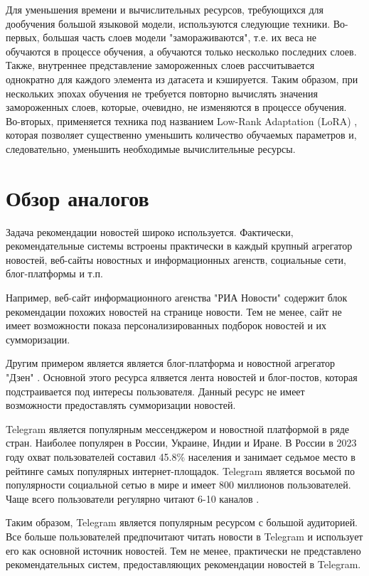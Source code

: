 Для уменьшения времени и вычислительных ресурсов, требующихся для дообучения большой языковой модели, используются следующие техники. Во-первых, большая часть слоев модели "замораживаются", т.е. их веса не обучаются в процессе обучения, а обучаются только несколько последних слоев. Также, внутреннее представление замороженных слоев рассчитывается однократно для каждого элемента из датасета и кэшируется. Таким образом, при нескольких эпохах обучения не требуется повторно вычислять значения замороженных слоев, которые, очевидно, не изменяются в процессе обучения. Во-вторых, применяется техника под названием Low-Rank Adaptation (LoRA) \cite{lora}, которая позволяет существенно уменьшить количество обучаемых параметров и, следовательно, уменьшить необходимые вычислительные ресурсы.

\section{Обзор аналогов}

Задача рекомендации новостей широко используется. Фактически, рекомендательные системы встроены практически в каждый крупный агрегатор новостей, веб-сайты новостных и информационных агенств, социальные сети, блог-платформы и т.п.

Например, веб-сайт информационного агенства "РИА Новости" \cite{ria_news} содержит блок рекомендации похожих новостей на странице новости. Тем не менее, сайт не имеет возможности показа персонализированных подборок новостей и их сумморизации.

Другим примером является является блог-платформа и новостной агрегатор "Дзен" \cite{dzen}. Основной этого ресурса ялвяется лента новостей и блог-постов, которая подстраивается под интересы пользователя. Данный ресурс не имеет возможности предоставлять сумморизации новостей.

Telegram \cite{telegram} является популярным мессенджером и новостной платформой в ряде стран. Наиболее популярен в России, Украине, Индии и Иране. В России в 2023 году охват пользователей составил 45.8\% населения и занимает седьмое место в рейтинге самых популярных интернет-площадок. Telegram является восьмой по популярности социальной сетью в мире и имеет 800 миллионов пользователей. Чаще всего пользователи регулярно читают 6-10 каналов \cite{telegram_stat}.

Таким образом, Telegram является популярным ресурсом с большой аудиторией. Все больше пользователей предпочитают читать новости в Telegram и использует его как основной источник новостей. Тем не менее, практически не представлено рекомендательных систем, предоставляющих рекомендации новостей в Telegram.

